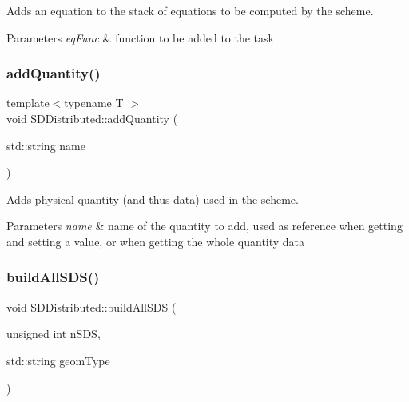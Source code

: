 Adds an equation to the stack of equations to be computed by the scheme. 


\begin{DoxyParams}{Parameters}
{\em eq\+Func} & function to be added to the task \\
\hline
\end{DoxyParams}
\mbox{\label{classSDDistributed_a82b5a390e964051d1952c683b4fa5f05}} 
\subsubsection{\texorpdfstring{add\+Quantity()}{addQuantity()}}
{\footnotesize\ttfamily template$<$typename T $>$ \\
void S\+D\+Distributed\+::add\+Quantity (\begin{DoxyParamCaption}\item[{std\+::string}]{name }\end{DoxyParamCaption})}



Adds physical quantity (and thus data) used in the scheme. 


\begin{DoxyParams}{Parameters}
{\em name} & name of the quantity to add, used as reference when getting and setting a value, or when getting the whole quantity data \\
\hline
\end{DoxyParams}
\mbox{\label{classSDDistributed_a3dbacea02c2d4f36310c81f87f90fe5a}} 
\subsubsection{\texorpdfstring{build\+All\+S\+D\+S()}{buildAllSDS()}}
{\footnotesize\ttfamily void S\+D\+Distributed\+::build\+All\+S\+DS (\begin{DoxyParamCaption}\item[{unsigned int}]{n\+S\+DS,  }\item[{std\+::string}]{geom\+Type }\end{DoxyParamCaption})}



